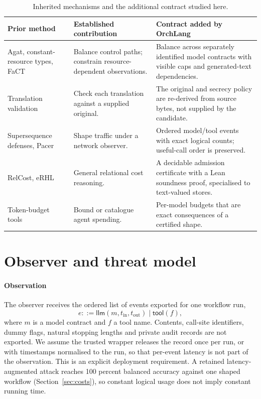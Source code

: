 \documentclass[preprint,12pt]{elsarticle}
\theoremstyle{definition}
\begin{document}
\begin{table}[t]
\centering\small
\caption{Inherited mechanisms and the additional contract studied here.}
\label{tab:delta}
\begin{tabular}{>{\raggedright\arraybackslash}p{28mm}>{\raggedright\arraybackslash}p{36mm}>{\raggedright\arraybackslash}p{54mm}}\toprule
Prior method & Established contribution & Contract added by OrchLang\\\midrule
Agat, constant-resource types, FaCT~\cite{agat2000transforming,ngo2017constant,cauligi2019fact}
& Balance control paths; constrain resource-dependent observations.
& Balance across separately identified model contracts with visible caps and
generated-text dependencies.\\[1mm]
Translation validation~\cite{pnueli1998tv,necula2000tv}
& Check each translation against a supplied original.
& The original and secrecy policy are re-derived from source bytes, not supplied
by the candidate.\\[1mm]
Supersequence defenses, Pacer~\cite{wang2014supersequence,mehta2022pacer}
& Shape traffic under a network observer.
& Ordered model/tool events with exact logical counts; useful-call order is preserved.\\[1mm]
RelCost, eRHL~\cite{cicek2017relcost,avanzini2025erhl}
& General relational cost reasoning.
& A decidable admission certificate with a Lean soundness proof, specialised to
text-valued stores.\\[1mm]
Token-budget tools~\cite{khan2026budgets,dickerson2026loom}
& Bound or catalogue agent spending.
& Per-model budgets that are exact consequences of a certified shape.\\\bottomrule
\end{tabular}
\end{table}

\section{Observer and threat model}\label{sec:scope}

\paragraph{Observation}
The observer receives the ordered list of events exported for one workflow run,
\[
e ::= \mathsf{llm}(m,t_{\mathrm{in}},t_{\mathrm{out}})\mid\mathsf{tool}(f),
\]
where $m$ is a model contract and $f$ a tool name. Contents, call-site
identifiers, dummy flags, natural stopping lengths and private audit records are
not exported. We assume the trusted wrapper releases the record once per run, or
with timestamps normalised to the run, so that per-event latency is not part of
the observation. This is an explicit deployment requirement. A retained
latency-augmented attack reaches 100 percent balanced accuracy against one shaped
workflow (Section~\ref{sec:costs}), so constant logical usage does not imply
constant running time.
\end{document}
